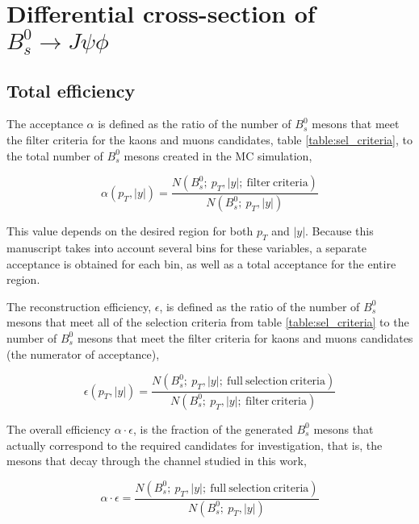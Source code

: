 \chapter[\leavevmode\newline Differential cross-section of $B^0_s \to J\psi \phi$]{Differential cross-section of $B^0_s \to J\psi \phi$}
\label{chap:Chapter_5}

\section{Total efficiency}

The acceptance $\alpha$ is defined as the ratio of the number of $B^0_s$ mesons that meet the filter criteria for the kaons and muons candidates, table \ref{table:sel_criteria}, to the total number of $B^0_s$ mesons created in the MC simulation,

\begin{equation}
\alpha(p_T, |y|) = \frac{N(B^0_s; \ p_T, |y| ; \ \mathrm{filter \ criteria})}{N(B^0_s; \ p_T, |y| )}
\end{equation}

This value depends on the desired region for both $p_T$ and $|y|$. Because this manuscript takes into account several bins for these variables, a separate acceptance is obtained for each bin, as well as a total acceptance for the entire region. 

The reconstruction efficiency, $\epsilon$, is defined as the ratio of the number of $B^0_s$ mesons that meet all of the selection criteria from table \ref{table:sel_criteria} to the number of $B^0_s$ mesons that meet the filter criteria for kaons and muons candidates (the numerator of acceptance),

\begin{equation}
	\epsilon(p_T, |y|) = \frac{N(B^0_s; \ p_T, |y| ; \ \mathrm{full \ selection \ criteria})}{N(B^0_s; \ p_T, |y| ; \ \mathrm{filter \ criteria})}
\end{equation}

The overall efficiency $\alpha \cdot \epsilon$, is the fraction of the generated $B^0_s$ mesons that actually correspond to the required candidates for investigation, that is, the mesons that decay through the channel studied in this work,

\begin{equation}
	\alpha \cdot \epsilon = \frac{N(B^0_s; \ p_T, |y| ; \ \mathrm{full \ selection \ criteria})}{N(B^0_s; \ p_T, |y|)}
\end{equation}

